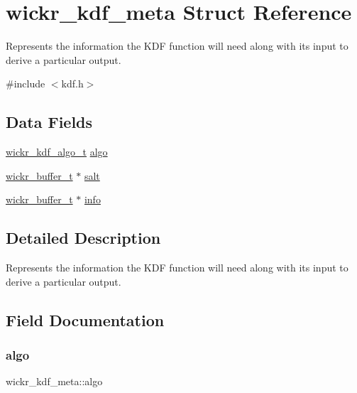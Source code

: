 \hypertarget{structwickr__kdf__meta}{}\section{wickr\+\_\+kdf\+\_\+meta Struct Reference}
\label{structwickr__kdf__meta}


Represents the information the K\+DF function will need along with it\textquotesingle{}s input to derive a particular output.  




{\ttfamily \#include $<$kdf.\+h$>$}

\subsection*{Data Fields}
\begin{DoxyCompactItemize}
\item 
\hyperlink{structwickr__kdf__algo}{wickr\+\_\+kdf\+\_\+algo\+\_\+t} \hyperlink{structwickr__kdf__meta_a263e1f7c77447a5a2a57c0d5d2f4ee34}{algo}
\item 
\hyperlink{structwickr__buffer}{wickr\+\_\+buffer\+\_\+t} $\ast$ \hyperlink{structwickr__kdf__meta_a315c54ee4578a01266a4e7352a52d459}{salt}
\item 
\hyperlink{structwickr__buffer}{wickr\+\_\+buffer\+\_\+t} $\ast$ \hyperlink{structwickr__kdf__meta_abf3edef445c8849c356d1282e49033f4}{info}
\end{DoxyCompactItemize}


\subsection{Detailed Description}
Represents the information the K\+DF function will need along with it\textquotesingle{}s input to derive a particular output. 

\subsection{Field Documentation}
\mbox{\label{structwickr__kdf__meta_a263e1f7c77447a5a2a57c0d5d2f4ee34}} 
\subsubsection{\texorpdfstring{algo}{algo}}
{\footnotesize\ttfamily wickr\+\_\+kdf\+\_\+meta\+::algo}

